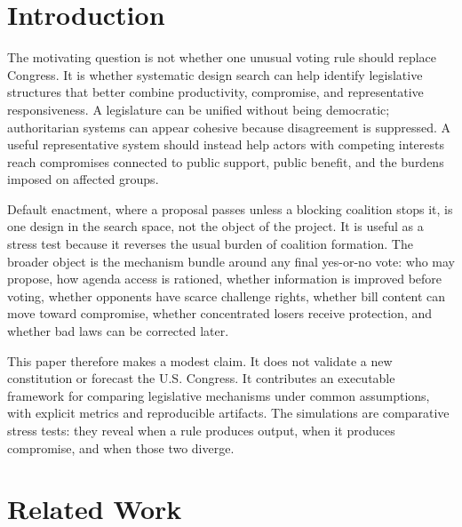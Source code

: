 \documentclass[manuscript,review,anonymous]{acmart}
\begin{document}


\maketitle

\section{Introduction}

The motivating question is not whether one unusual voting rule should replace Congress. It is whether systematic design search can help identify legislative structures that better combine productivity, compromise, and representative responsiveness. A legislature can be unified without being democratic; authoritarian systems can appear cohesive because disagreement is suppressed. A useful representative system should instead help actors with competing interests reach compromises connected to public support, public benefit, and the burdens imposed on affected groups.

Default enactment, where a proposal passes unless a blocking coalition stops it, is one design in the search space, not the object of the project. It is useful as a stress test because it reverses the usual burden of coalition formation. The broader object is the mechanism bundle around any final yes-or-no vote: who may propose, how agenda access is rationed, whether information is improved before voting, whether opponents have scarce challenge rights, whether bill content can move toward compromise, whether concentrated losers receive protection, and whether bad laws can be corrected later.

This paper therefore makes a modest claim. It does not validate a new constitution or forecast the U.S. Congress. It contributes an executable framework for comparing legislative mechanisms under common assumptions, with explicit metrics and reproducible artifacts. The simulations are comparative stress tests: they reveal when a rule produces output, when it produces compromise, and when those two diverge.

\section{Related Work}
\end{document}
